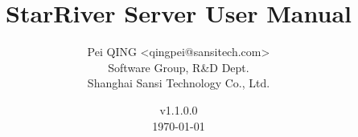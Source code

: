 \title{\textbf{StarRiver Server User Manual}}

\author{Pei QING <qingpei@sansitech.com> \\
        Software Group, R\&D Dept.\\
        Shanghai Sansi Technology Co., Ltd.
}

\date{\vspace{3em} v1.1.0.0 \\\vspace{3em} \today}
